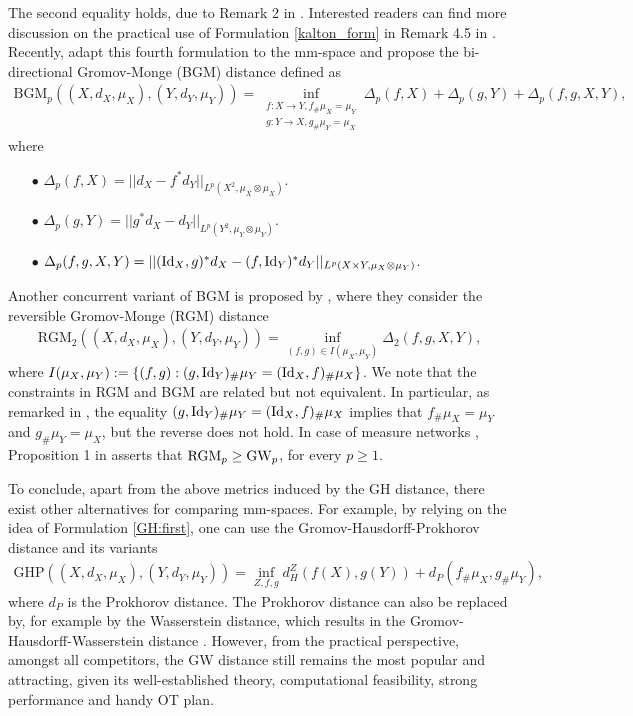 The second equality holds, due to Remark 2 in \citep{Memoli05}. Interested readers can find
more discussion on the practical use of Formulation \eqref{kalton_form} in
Remark 4.5 in \citep{Memoli11b}.
Recently, \citep{Zhang21} adapt this fourth formulation to the mm-space and propose
the bi-directional Gromov-Monge (BGM) distance defined as
\begin{align}
  \text{BGM}_p((X, d_X, \mu_X), (Y, d_Y, \mu_Y)) =
  \inf_{\substack{f: X \to Y, f_{\#}\mu_X = \mu_Y \\ g: Y \to X, g_{\#} \mu_Y = \mu_X}}
  \Delta_{p}(f,X) + \Delta_{p}(g,Y) + \Delta_{p}(f,g, X, Y),
\end{align}
where
\begin{itemize}
  \item[$\bullet$] $\Delta_{p}(f, X) = || d_X - f^* d_Y ||_{L^p(X^2, \mu_X \otimes \mu_X)}$.
  \item[$\bullet$] $\Delta_{p}(g, Y) = || g^* d_X - d_Y ||_{L^p(Y^2, \mu_Y \otimes \mu_Y)}$.
  \item[$\bullet$] $\Delta_{p}(f,g, X, Y) = || (\text{Id}_X, g)^*d_X - (f, \text{Id}_Y)^*d_Y ||_{L^p(X \times Y, \mu_X \otimes \mu_Y)}$.
\end{itemize}
Another concurrent variant of BGM is proposed by \citep{Hur21},
where they consider the reversible Gromov-Monge (RGM) distance
\begin{align}
  \text{RGM}_2((X, d_X, \mu_X), (Y, d_Y, \mu_Y)) =
  \inf_{(f,g) \in I(\mu_X, \mu_Y)} \Delta_2(f,g, X, Y),
\end{align}
where $I(\mu_X, \mu_Y) := \{(f, g): (g, \text{Id}_Y)_{\#} \mu_Y = (\text{Id}_X, f)_{\#} \mu_X \}$.
We note that the constraints in RGM and BGM are related but not equivalent. In particular,
as remarked in \citep{Hur21}, the equality $(g, \text{Id}_Y)_{\#} \mu_Y = (\text{Id}_X, f)_{\#} \mu_X$
implies that $ f_{\#}\mu_X = \mu_Y$ and $g_{\#} \mu_Y = \mu_X$, but the reverse does not hold.
In case of measure networks \citep{Chowdhury19}, Proposition 1 in \citep{Hur21} asserts that
$\text{RGM}_p \geq \text{GW}_p$, for every $p \geq 1$.

To conclude, apart from the above metrics induced by the GH distance, there exist other
alternatives for comparing mm-spaces. For example, by relying on the idea of
Formulation \eqref{GH:first},
one can use the Gromov-Hausdorff-Prokhorov distance \citep{Villani08} and
its variants \citep{Abraham13,Miermont09}
\begin{align}
  \text{GHP}((X, d_X, \mu_X), (Y, d_Y, \mu_Y)) =
  \inf_{Z, f, g} d_H^Z(f(X), g(Y)) + d_P(f_{\#} \mu_X, g_{\#} \mu_Y),
\end{align}
where $d_P$ is the Prokhorov distance. The Prokhorov distance can also be replaced by,
for example by the Wasserstein distance, which results in the
Gromov-Hausdorff-Wasserstein distance \citep{Villani08}. However, from the practical perspective,
amongst all competitors, the GW distance still remains the most popular and attracting,
given its well-established theory, computational feasibility, strong performance and
handy OT plan.

